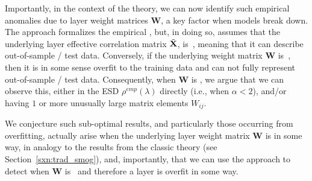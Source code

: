 Importantly, in the context of the \SETOL theory, we can now identify such empirical anomalies
due to \ATypical layer weight matrices $\mathbf{W}$, a key factor when models break down.
The \SETOL approach formalizes the empirical \HTSR \Phenomenology,
but, in doing so, assumes that the
underlying layer effective correlation matrix $\tilde{\mathbf{X}}$, is~\Typical, meaning that it can describe out-of-sample / test data.
Conversely, if the underlying weight matrix $\mathbf{W}$ is~\ATypical, then it is in some sense
overfit to the  training data and can not fully represent out-of-sample / test data.
Consequently, when $\mathbf{W}$ is \ATypical,  we argue that we can observe this, either in the ESD $\rho^{emp}(\lambda)$ directly
(i.e., when $\alpha< 2$),
and/or having $1$ or more unusually large matrix elements $W_{ij}$.

We conjecture such sub-optimal results, and particularly those occurring from overfitting, actually
arise when the underlying layer weight matrix $\mathbf{W}$ is \ATypical in some way,
in analogy to the results from the classic \SMOG theory (see Section~\ref{sxn:trad_smog}),
and, importantly, that we can use the \SETOL approach to detect when $\mathbf{W}$ is~\ATypical
and therefore a layer is overfit in some way.


